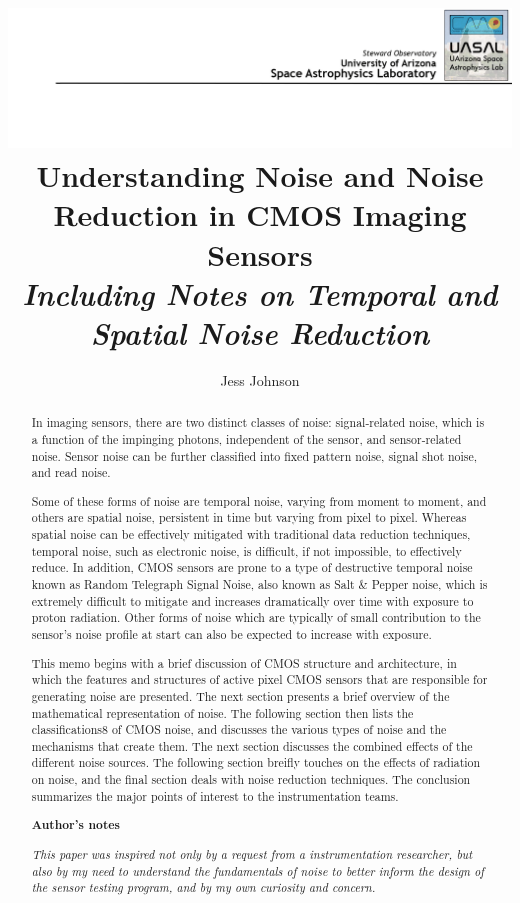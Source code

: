 \documentclass[10pt]{article}
\title{
    {\vspace{-1.5cm}}
    {\hspace{-2cm}}   
    {\includegraphics{assets/UASAL_Header.png}}
    {\large }\\
    {Understanding Noise and Noise Reduction in CMOS Imaging Sensors}\\
    {\large \emph{Including Notes on Temporal and Spatial Noise Reduction}}
 }
\author{\large Jess Johnson}
\affil{\small Senior Instrumentation Scientist \\ Steward Observatory, University of Arizona \\ 11 April 2024 \\ \footnotesize Release Version One}
\date{}
\begin{document}
\maketitle


\begin{abstract}

In imaging sensors, there are two distinct classes of noise: signal-related noise, which is a function of the impinging photons, independent of the sensor, and sensor-related noise. Sensor noise can be further classified into fixed pattern noise, signal shot noise, and read noise. 

Some of these forms of noise are temporal noise, varying from moment to moment, and others are spatial noise, persistent in time but varying from pixel to pixel. Whereas spatial noise can be effectively mitigated with traditional data reduction techniques, temporal noise, such as electronic noise, is difficult, if not impossible, to effectively reduce. In addition, CMOS sensors are prone to a type of destructive temporal noise known as Random Telegraph Signal Noise, also known as Salt \& Pepper noise, which is extremely difficult to mitigate and increases dramatically over time with exposure to proton radiation. Other forms of noise which are typically of small contribution to the sensor's noise profile at start can also be expected to increase with exposure.

This memo begins with a brief discussion of CMOS structure and architecture, in which the features and structures of active pixel CMOS sensors that are responsible for generating noise are presented. The next section presents a brief overview of the mathematical representation of noise. The following section then lists the classifications8 of CMOS noise, and discusses the various types of noise and the mechanisms that create them.  The next section discusses the combined effects of the different noise sources. The following section breifly touches on the effects of radiation on noise, and the final section deals with noise reduction techniques. The conclusion summarizes the major points of interest to the instrumentation teams.

\newpage

\centerline{\textbf{Author's notes}}

\vspace{5mm}

\emph{This paper was inspired not only by a request from a instrumentation researcher, but also by my need to understand the fundamentals of noise to better inform the design of the sensor testing program, and by my own curiosity and concern.}


\end{abstract}
\end{document}

